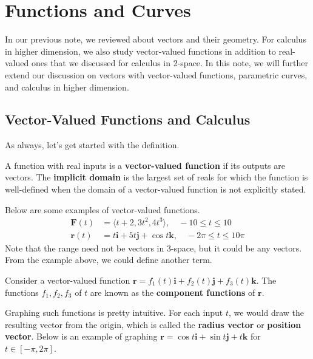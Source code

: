 \documentclass[../../../main.tex]{subfiles}
\begin{document}
\chapter{Functions and Curves}

In our previous note, we reviewed about vectors and their geometry.
For calculus in higher dimension, we also study vector-valued
functions in addition to real-valued ones that we discussed for
calculus in 2-space. In this note, we will further extend our
discussion on vectors with vector-valued functions, parametric
curves, and calculus in higher dimension.

\section{Vector-Valued Functions and Calculus}

As always, let's get started with the definition.

\begin{definition}{}{}
A function with real inputs is a \textbf{vector-valued function}
if its outputs are vectors. The \textbf{implicit domain} is the
largest set of reals for which the function is well-defined
when the domain of a vector-valued function is not explicitly
stated.
\end{definition}

Below are some examples of vector-valued functions.
\begin{align*}
    \mathbf{F}(t) &= \langle t + 2, 3t^2, 4t^3 \rangle,
        \quad -10 \leq t \leq 10 \\
    \mathbf{r}(t) &= t \mathbf{i} + 5t \mathbf{j} + \cos t \mathbf{k},
        \quad -2\pi \leq t \leq 10\pi
\end{align*}
Note that the range need not be vectors in 3-space, but it could
be any vectors. From the example above, we could define another term.

\begin{definition}{}{}
Consider a vector-valued function $\mathbf{r} = f_1 (t) \mathbf{i}
+ f_2 (t) \mathbf{j} + f_3 (t) \mathbf{k}$. The functions $f_1, f_2,
f_3$ of $t$ are known as the \textbf{component functions} of
$\mathbf{r}$.
\end{definition}

Graphing such functions is pretty intuitive. For each input $t$,
we would draw the resulting vector from the origin, which is called
the \textbf{radius vector} or \textbf{position vector}. Below is an
example of graphing $\mathbf{r} = \cos t \mathbf{i} +
\sin t \mathbf{j} + t \mathbf{k}$ for $t \in [-\pi, 2\pi]$.
\end{document}
